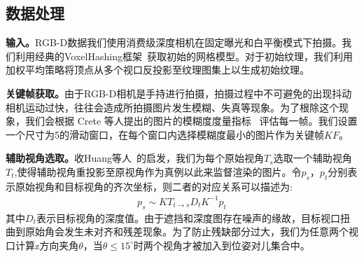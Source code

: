 \subsection{数据处理}
\noindent\textbf{输入。}RGB-D数据我们使用消费级深度相机在固定曝光和白平衡模式下拍摄。我们利用经典的VoxelHashing框架~\cite{MatthiasNiener2013Realtime3R}获取初始的网格模型。对于初始纹理，我们利用加权平均策略将顶点从多个视口反投影至纹理图集上以生成初始纹理。\par
\noindent\textbf{关键帧获取。}由于RGB-D相机是手持进行拍摄，拍摄过程中不可避免的出现抖动相机运动过快，往往会造成所拍摄图片发生模糊、失真等现象。为了根除这个现象，我们会根据 Crete 等人提出的图片的模糊度度量指标 ~\cite{FrederiqueCrete2007TheBE}评估每一帧。我们设置一个尺寸为5的滑动窗口，在每个窗口内选择模糊度最小的图片作为关键帧$KF$。 \par
\noindent\textbf{辅助视角选取。}收Huang等人~\cite{JingweiHuang2020AdversarialTO}的启发，我们为每个原始视角$T_s$选取一个辅助视角$T_t$,使得辅助视角重投影至原视角作为真例以此来监督渲染的图片。令$p_s$，$p_t$分别表示原始视角和目标视角的齐次坐标，则二者的对应关系可以描述为:
\begin{align}
	p_s\sim KT_{t\rightarrow s}D_tK^{-1}p_t
\end{align}
其中$D_t$表示目标视角的深度值。由于遮挡和深度图存在噪声的缘故，目标视口扭曲到原始角会发生未对齐和残差现象。为了防止残缺部分过大，我们为任意两个视口计算z方向夹角$\theta$，当$\theta\le15^{\circ}$时两个视角才被加入到位姿对儿集合中。

